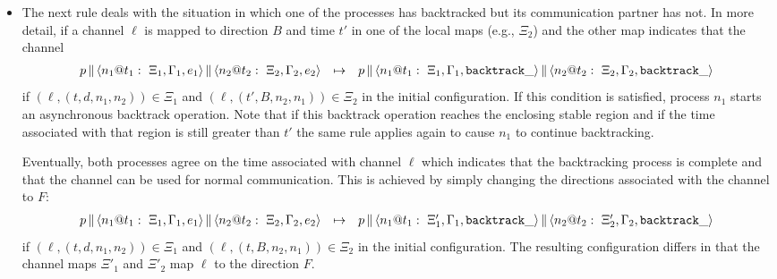 \documentclass{article}
\begin{document}
\begin{itemize}
\item The next rule deals with the situation in which one of the processes
  has backtracked but its communication partner has not. In more detail, if a
  channel $\ell$ is mapped to direction $B$ and time $t'$ in one of the local
  maps (e.g., $\Xi_2$) and the other map indicates that the channel 
\[\begin{array}{rcl}
\parc{p}
  {\parc{\proc{n_1}{\Gamma_1}{\Xi_1}{e_1}{t_1}}
  {\proc{n_2}{\Gamma_2}{\Xi_2}{e_2}{t_2}}} &\mapsto& 
\parc{p}
  {\parc{\proc{n_1}{\Gamma_1}{\Xi_1}{\abacktrack}{t_1}}
  {\proc{n_2}{\Gamma_2}{\Xi_2}{\abacktrack}{t_2}}} 
\end{array}\]
if $(\ell,(t,d,n_1,n_2)) \in \Xi_1$ and $(\ell,(t',B,n_2,n_1)) \in \Xi_2$ in
the initial configuration. If this condition is satisfied, process $n_1$ 
starts an asynchronous backtrack operation. Note that if this backtrack operation 
reaches the enclosing stable region and if the time associated with that region
is still greater than $t'$ the same rule applies again to cause $n_1$ to continue
backtracking. 

Eventually, both processes agree on the time associated with channel $\ell$
which indicates that the backtracking process is complete and that the
channel can be used for normal communication. This is achieved by simply
changing the directions associated with the channel to $F$:
\[\begin{array}{rcl}
\parc{p}
  {\parc{\proc{n_1}{\Gamma_1}{\Xi_1}{e_1}{t_1}}
  {\proc{n_2}{\Gamma_2}{\Xi_2}{e_2}{t_2}}} &\mapsto& 
\parc{p}
  {\parc{\proc{n_1}{\Gamma_1}{\Xi'_1}{\abacktrack}{t_1}}
  {\proc{n_2}{\Gamma_2}{\Xi'_2}{\abacktrack}{t_2}}} 
\end{array}\]
if $(\ell,(t,d,n_1,n_2)) \in \Xi_1$ and $(\ell,(t,B,n_2,n_1)) \in \Xi_2$ in 
the initial configuration. The resulting configuration differs in that the 
channel maps $\Xi'_1$ and $\Xi'_2$ map $\ell$ to the direction $F$. 
\end{itemize}

\end{document}
